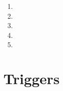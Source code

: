 \documentclass[12pt]{report}
\begin{document}
    \begin{enumerate}
        \item 
        \item 
        \item 
        \item 
        \item 
    \end{enumerate}

    \section*{\Huge Triggers}
\end{document}
